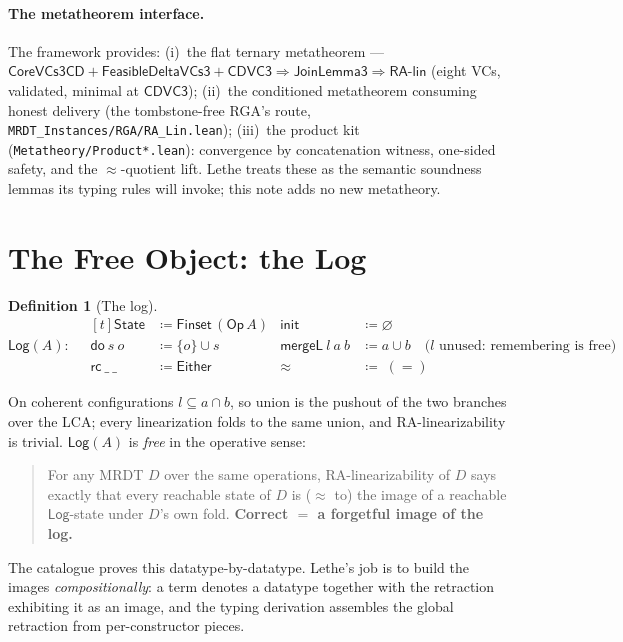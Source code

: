 \documentclass[11pt]{article}
\newtheorem{definition}[theorem]{Definition}
\newcommand{\mergeL}{\mathsf{mergeL}}
\newcommand{\co}{\mathsf{CoreVCs3CD}}
\newcommand{\fd}{\mathsf{FeasibleDeltaVCs3}}
\newcommand{\cd}{\mathsf{CDVC3}}
\newcommand{\lean}[1]{\texttt{#1}}
\newcommand{\dodo}{\mathsf{do}}
\newcommand{\eqobs}{\approx}
\newcommand{\rc}{\mathsf{rc}}
\newcommand{\Log}{\mathsf{Log}}
\newcommand{\State}{\mathsf{State}}
\newcommand{\init}{\mathsf{init}}
\newcommand{\Op}{\mathsf{Op}}
\newcommand{\Either}{\mathsf{Either}}
\newcommand{\RA}{\textsf{RA-lin}}
\begin{document}
\paragraph{The metatheorem interface.} The framework provides:
(i)~the flat ternary metatheorem ---
$\co + \fd + \cd \Rightarrow \mathsf{JoinLemma3} \Rightarrow \RA$
(eight VCs, validated, minimal at $\cd$);
(ii)~the conditioned metatheorem consuming honest delivery (the
tombstone-free RGA's route,
\lean{MRDT\_Instances/RGA/RA\_Lin.lean});
(iii)~the product kit (\lean{Metatheory/Product*.lean}): convergence by
concatenation witness, one-sided safety, and the $\eqobs$-quotient lift.
Lethe treats these as the semantic soundness lemmas its typing rules will
invoke; this note adds no new metatheory.

\section{The Free Object: the Log}\label{sec:log}

\begin{definition}[The log]\label{def:log}
\[
\Log(A):\quad
\begin{aligned}[t]
\State &\coloneqq \mathsf{Finset}\,(\Op\,A) &
\init &\coloneqq \varnothing \\
\dodo\ s\ o &\coloneqq \{o\} \cup s &
\mergeL\ l\ a\ b &\coloneqq a \cup b
  \quad\text{($l$ unused: remembering is free)} \\
\rc\ \_\ \_ &\coloneqq \Either &
\eqobs\; &\coloneqq\; (=)
\end{aligned}
\]
\end{definition}

On coherent configurations $l \subseteq a \cap b$, so union is the pushout
of the two branches over the LCA; every linearization folds to the same
union, and RA-linearizability is trivial. $\Log(A)$ is \emph{free} in the
operative sense:

\begin{quote}
For any MRDT $D$ over the same operations, RA-linearizability of $D$ says
exactly that every reachable state of $D$ is ($\eqobs$ to) the image of a
reachable $\Log$-state under $D$'s own fold. \textbf{Correct $=$ a
forgetful image of the log.}
\end{quote}

The catalogue proves this datatype-by-datatype. Lethe's job is to build
the images \emph{compositionally}: a term denotes a datatype together with
the retraction exhibiting it as an image, and the typing derivation
assembles the global retraction from per-constructor pieces.
\end{document}

